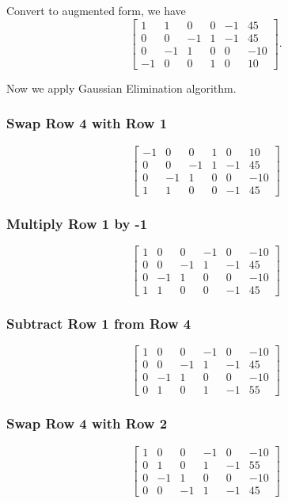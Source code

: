 \documentclass[12pt,a4paper]{article}
\begin{document}
\begin{solution}
Convert to augmented form, we have
\[
\left[ \begin{array}{ccccc|c}
1 & 1 & 0 & 0 & -1 & 45 \\
0 & 0 & -1 & 1 & -1 & 45 \\
0 & -1 & 1 & 0 & 0 & -10 \\
-1 & 0 & 0 & 1 & 0 & 10 
\end{array} \right].
\]

Now we apply Gaussian Elimination algorithm.
\subsubsection*{Swap Row 4 with Row 1}
\[
\left[ \begin{array}{ccccc|c}
-1 & 0 & 0 & 1 & 0 & 10 \\
0 & 0 & -1 & 1 & -1 & 45 \\
0 & -1 & 1 & 0 & 0 & -10 \\
1 & 1 & 0 & 0 & -1 & 45 
\end{array} \right]
\]

\subsubsection*{Multiply Row 1 by -1}
\[
\left[ \begin{array}{ccccc|c}
1 & 0 & 0 & -1 & 0 & -10 \\
0 & 0 & -1 & 1 & -1 & 45 \\
0 & -1 & 1 & 0 & 0 & -10 \\
1 & 1 & 0 & 0 & -1 & 45 
\end{array} \right]
\]

\subsubsection*{Subtract Row 1 from Row 4}
\[
\left[ \begin{array}{ccccc|c}
1 & 0 & 0 & -1 & 0 & -10 \\
0 & 0 & -1 & 1 & -1 & 45 \\
0 & -1 & 1 & 0 & 0 & -10 \\
0 & 1 & 0 & 1 & -1 & 55 
\end{array} \right]
\]

\subsubsection*{Swap Row 4 with Row 2}
\[
\left[ \begin{array}{ccccc|c}
1 & 0 & 0 & -1 & 0 & -10 \\
0 & 1 & 0 & 1 & -1 & 55 \\
0 & -1 & 1 & 0 & 0 & -10 \\
0 & 0 & -1 & 1 & -1 & 45 
\end{array} \right]
\]


\end{solution}
\end{document}

